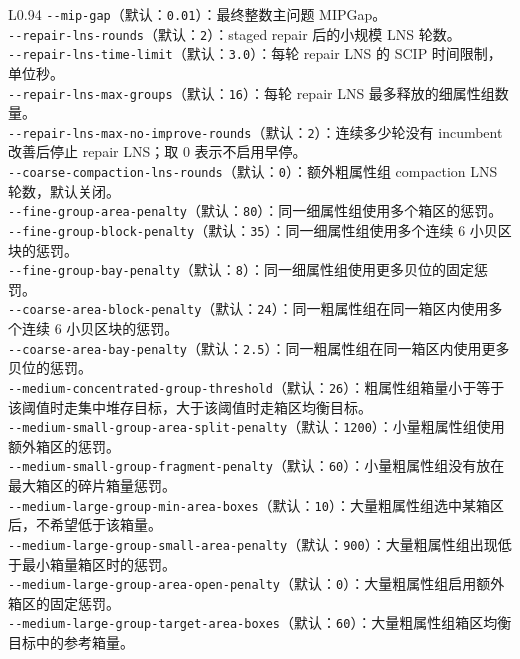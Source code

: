 \documentclass[UTF8,a4paper,11pt]{ctexart}
\newcommand{\code}[1]{\nolinkurl{#1}}
\begin{document}
\begin{longtable}{L{0.94\linewidth}}
\code{--mip-gap}（默认：\code{0.01}）：最终整数主问题 MIPGap。\\[0.25em]
\code{--repair-lns-rounds}（默认：\code{2}）：staged repair 后的小规模 LNS 轮数。\\[0.25em]
\code{--repair-lns-time-limit}（默认：\code{3.0}）：每轮 repair LNS 的 SCIP 时间限制，单位秒。\\[0.25em]
\code{--repair-lns-max-groups}（默认：\code{16}）：每轮 repair LNS 最多释放的细属性组数量。\\[0.25em]
\code{--repair-lns-max-no-improve-rounds}（默认：\code{2}）：连续多少轮没有 incumbent 改善后停止 repair LNS；取 0 表示不启用早停。\\[0.25em]
\code{--coarse-compaction-lns-rounds}（默认：\code{0}）：额外粗属性组 compaction LNS 轮数，默认关闭。\\[0.25em]
\code{--fine-group-area-penalty}（默认：\code{80}）：同一细属性组使用多个箱区的惩罚。\\[0.25em]
\code{--fine-group-block-penalty}（默认：\code{35}）：同一细属性组使用多个连续 6 小贝区块的惩罚。\\[0.25em]
\code{--fine-group-bay-penalty}（默认：\code{8}）：同一细属性组使用更多贝位的固定惩罚。\\[0.25em]
\code{--coarse-area-block-penalty}（默认：\code{24}）：同一粗属性组在同一箱区内使用多个连续 6 小贝区块的惩罚。\\[0.25em]
\code{--coarse-area-bay-penalty}（默认：\code{2.5}）：同一粗属性组在同一箱区内使用更多贝位的惩罚。\\[0.25em]
\code{--medium-concentrated-group-threshold}（默认：\code{26}）：粗属性组箱量小于等于该阈值时走集中堆存目标，大于该阈值时走箱区均衡目标。\\[0.25em]
\code{--medium-small-group-area-split-penalty}（默认：\code{1200}）：小量粗属性组使用额外箱区的惩罚。\\[0.25em]
\code{--medium-small-group-fragment-penalty}（默认：\code{60}）：小量粗属性组没有放在最大箱区的碎片箱量惩罚。\\[0.25em]
\code{--medium-large-group-min-area-boxes}（默认：\code{10}）：大量粗属性组选中某箱区后，不希望低于该箱量。\\[0.25em]
\code{--medium-large-group-small-area-penalty}（默认：\code{900}）：大量粗属性组出现低于最小箱量箱区时的惩罚。\\[0.25em]
\code{--medium-large-group-area-open-penalty}（默认：\code{0}）：大量粗属性组启用额外箱区的固定惩罚。\\[0.25em]
\code{--medium-large-group-target-area-boxes}（默认：\code{60}）：大量粗属性组箱区均衡目标中的参考箱量。\\[0.25em]

\end{longtable}
\end{document}
